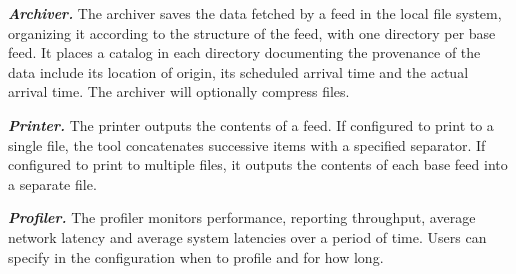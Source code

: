 

    


\textbf{\textit{Archiver.}} The archiver saves the data fetched by a feed 
in the local file system, organizing it according to the structure
of the feed, with one directory per base feed.  
It places a catalog in each directory documenting the provenance of 
the data include its location of origin, its scheduled arrival time and the
actual arrival time. The archiver will optionally compress
files.

\textbf{\textit{Printer.}} The printer outputs the contents of a
feed.  If configured to print to a single file, the tool concatenates
successive items with a specified separator. If configured to print to
multiple files, it outputs the contents of each base feed into a
separate file. 


\textbf{\textit{Profiler.}} The profiler monitors performance, reporting
throughput, average network latency and average system latencies
over a period of time. Users can specify in the configuration 
when to profile and for how long.  

